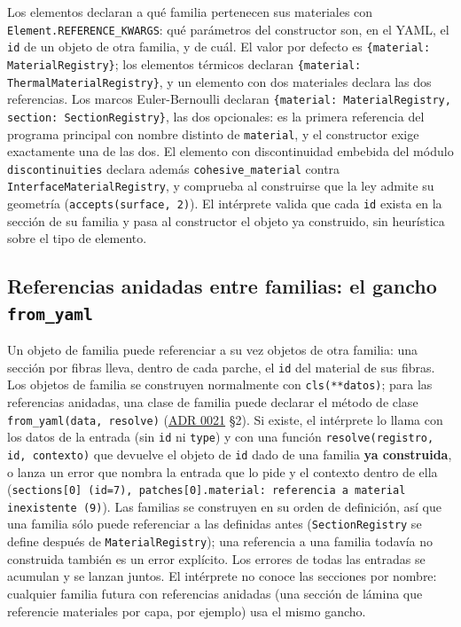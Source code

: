 \documentclass[11pt,oneside]{report}
\begin{document}
Los elementos declaran a qué familia pertenecen sus materiales con \texttt{Element.\allowbreak{}REFERENCE\_\allowbreak{}KWARGS}: qué parámetros del constructor son, en el YAML, el \texttt{id} de un objeto de otra familia, y de cuál. El valor por defecto es \texttt{\{\textquotedbl{}material\textquotedbl{}: MaterialRegistry\}}; los elementos térmicos declaran \texttt{\{\textquotedbl{}material\textquotedbl{}: ThermalMaterialRegistry\}}, y un elemento con dos materiales declara las dos referencias. Los marcos Euler-Bernoulli declaran \texttt{\{\textquotedbl{}material\textquotedbl{}: MaterialRegistry, \textquotedbl{}section\textquotedbl{}: SectionRegistry\}}, las dos opcionales: es la primera referencia del programa principal con nombre distinto de \texttt{material}, y el constructor exige exactamente una de las dos. El elemento con discontinuidad embebida del módulo \texttt{discontinuities} declara además \texttt{cohesive\_\allowbreak{}material} contra \texttt{InterfaceMaterialRegistry}, y comprueba al construirse que la ley admite su geometría (\texttt{accepts(\textquotedbl{}surface\textquotedbl{}, 2)}). El intérprete valida que cada \texttt{id} exista en la sección de su familia y pasa al constructor el objeto ya construido, sin heurística sobre el tipo de elemento.

\subsection{Referencias anidadas entre familias: el gancho \texttt{from\_yaml}}

Un objeto de familia puede referenciar a su vez objetos de otra familia: una sección por fibras lleva, dentro de cada parche, el \texttt{id} del material de sus fibras. Los objetos de familia se construyen normalmente con \texttt{cls(**datos)}; para las referencias anidadas, una clase de familia puede declarar el método de clase \texttt{from\_\allowbreak{}yaml(data, resolve)} (\hyperref[adr:0021]{ADR 0021} §2). Si existe, el intérprete lo llama con los datos de la entrada (sin \texttt{id} ni \texttt{type}) y con una función \texttt{resolve(registro, id, contexto)} que devuelve el objeto de \texttt{id} dado de una familia \textbf{ya construida}, o lanza un error que nombra la entrada que lo pide y el contexto dentro de ella (\texttt{sections[0] (id=7), patches[0].\allowbreak{}material: referencia a material inexistente (9)}). Las familias se construyen en su orden de definición, así que una familia sólo puede referenciar a las definidas antes (\texttt{SectionRegistry} se define después de \texttt{MaterialRegistry}); una referencia a una familia todavía no construida también es un error explícito. Los errores de todas las entradas se acumulan y se lanzan juntos. El intérprete no conoce las secciones por nombre: cualquier familia futura con referencias anidadas (una sección de lámina que referencie materiales por capa, por ejemplo) usa el mismo gancho.
\end{document}
